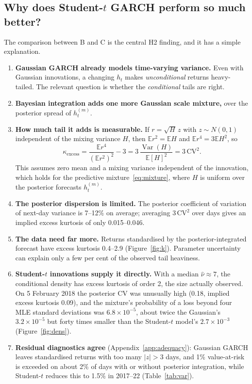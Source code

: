 \documentclass[11pt]{article}
\newcommand{\E}{\mathbb{E}}
\newcommand{\Var}{\operatorname{Var}}
\begin{document}
\subsection{Why does Student-\texorpdfstring{$t$}{t} GARCH perform so much better?}
The comparison between B and C is the central H2 finding, and it has a simple explanation.
\begin{enumerate}
\item \textbf{Gaussian GARCH already models time-varying variance.} Even with Gaussian innovations, a changing $h_t$
makes \emph{unconditional} returns heavy-tailed. The relevant question is whether the \emph{conditional} tails are right.
\item \textbf{Bayesian integration adds one more Gaussian scale mixture,} over the posterior spread of $h_t^{(m)}$.
\item \textbf{How much tail it adds is measurable.} If $r=\sqrt H\,z$ with $z\sim N(0,1)$ independent of the mixing
variance $H$, then $\E r^2=\E H$ and $\E r^4=3\E H^2$, so
\begin{equation}\label{eq:kurt}
\kappa_{\text{excess}}=\frac{\E r^4}{(\E r^2)^2}-3=3\,\frac{\Var(H)}{\E[H]^2}=3\,\mathrm{CV}^2 .
\end{equation}
This assumes zero mean and a mixing variance independent of the innovation, which holds for the predictive
mixture~\eqref{eq:mixture}, where $H$ is uniform over the posterior forecasts $h_t^{(m)}$.
\item \textbf{The posterior dispersion is limited.} The posterior coefficient of variation of next-day variance is
7--12\% on average; averaging $3\,\mathrm{CV}^2$ over days gives an implied excess kurtosis of only 0.015--0.046.
\item \textbf{The data need far more.} Returns standardised by the posterior-integrated forecast have excess kurtosis 0.4--2.9
(Figure~\ref{fig:k}). Parameter uncertainty can explain only a few per cent of the observed tail heaviness.
\item \textbf{Student-$t$ innovations supply it directly.} With a median $\hat\nu\approx7$, the conditional density
has excess kurtosis of order 2, the size actually observed. On 5 February 2018 the posterior CV was unusually high
(0.18, implied excess kurtosis 0.09), and the mixture's probability of a loss beyond four MLE standard deviations was
$6.8\times10^{-5}$, about twice the Gaussian's $3.2\times10^{-5}$ but forty times smaller than the Student-$t$
model's $2.7\times10^{-3}$ (Figure~\ref{fig:dens}).
\item \textbf{Residual diagnostics agree} (Appendix~\ref{app:adequacy}): Gaussian GARCH leaves standardised returns
with too many $|z|>3$ days, and 1\% value-at-risk is exceeded on about 2\% of days with or without posterior
integration, while Student-$t$ reduces this to 1.5\% in 2017--22 (Table~\ref{tab:var}).
\end{enumerate}
\end{document}
